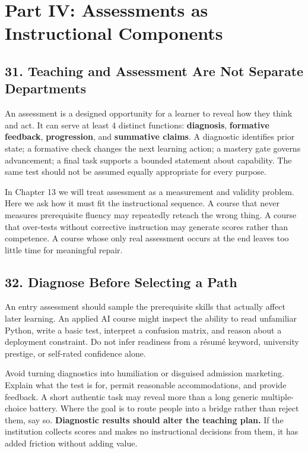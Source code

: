 \section*{Part IV: Assessments as Instructional Components}

\subsection*{31. Teaching and Assessment Are Not Separate Departments}

An assessment is a designed opportunity for a learner to reveal how they think and act. It can serve at least 4 distinct functions: \textbf{diagnosis}, \textbf{formative feedback}, \textbf{progression}, and \textbf{summative claims}. A diagnostic identifies prior state; a formative check changes the next learning action; a mastery gate governs advancement; a final task supports a bounded statement about capability. The same test should not be assumed equally appropriate for every purpose.

In Chapter 13 we will treat assessment as a measurement and validity problem. Here we ask how it must fit the instructional sequence. A course that never measures prerequisite fluency may repeatedly reteach the wrong thing. A course that over-tests without corrective instruction may generate scores rather than competence. A course whose only real assessment occurs at the end leaves too little time for meaningful repair.

\subsection*{32. Diagnose Before Selecting a Path}

An entry assessment should sample the prerequisite skills that actually affect later learning. An applied AI course might inspect the ability to read unfamiliar Python, write a basic test, interpret a confusion matrix, and reason about a deployment constraint. Do not infer readiness from a résumé keyword, university prestige, or self-rated confidence alone.

Avoid turning diagnostics into humiliation or disguised admission marketing. Explain what the test is for, permit reasonable accommodations, and provide feedback. A short authentic task may reveal more than a long generic multiple-choice battery. Where the goal is to route people into a bridge rather than reject them, say so. \textbf{Diagnostic results should alter the teaching plan.} If the institution collects scores and makes no instructional decisions from them, it has added friction without adding value.

